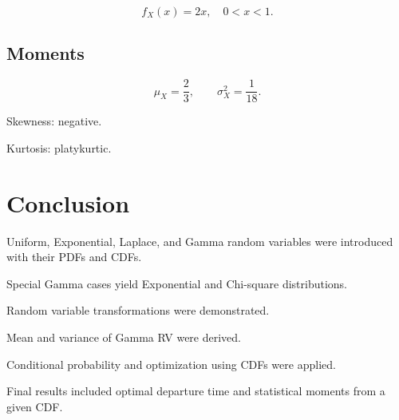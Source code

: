 \documentclass[11pt]{article}
\begin{document}
\[
f_X(x)=2x,\quad 0<x<1.
\]

\subsection*{Moments}

\[
\mu_X=\frac23, \qquad \sigma_X^2=\frac1{18}.
\]

Skewness: negative.

Kurtosis: platykurtic.

\section{Conclusion}

Uniform, Exponential, Laplace, and Gamma random variables were introduced with their PDFs and CDFs.

Special Gamma cases yield Exponential and Chi-square distributions.

Random variable transformations were demonstrated.

Mean and variance of Gamma RV were derived.

Conditional probability and optimization using CDFs were applied.

Final results included optimal departure time and statistical moments from a given CDF.
\end{document}
